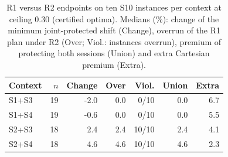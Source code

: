 \begin{table}[tb]
\centering
\caption{R1 versus R2 endpoints on ten S10 instances per context at ceiling 0.30 (certified optima). Medians (\%): change of the minimum joint-protected shift (Change), overrun of the R1 plan under R2 (Over; Viol.: instances overrun), premium of protecting both sessions (Union) and extra Cartesian premium (Extra).}
\label{tab:reliability20-planning}
\scriptsize\setlength{\tabcolsep}{3pt}
\begin{tabular}{@{}lrrrrrr@{}}
\toprule
Context & $n$ & Change & Over & Viol. & Union & Extra\\\midrule
S1+S3 & 19 & -2.0 & 0.0 & 0/10 & 0.0 & 6.7\\
S1+S4 & 19 & -0.6 & 0.0 & 0/10 & 0.0 & 5.5\\
S2+S3 & 18 & 2.4 & 2.4 & 10/10 & 2.4 & 4.1\\
S2+S4 & 18 & 4.6 & 4.6 & 10/10 & 4.6 & 2.3\\
\bottomrule
\end{tabular}
\end{table}
